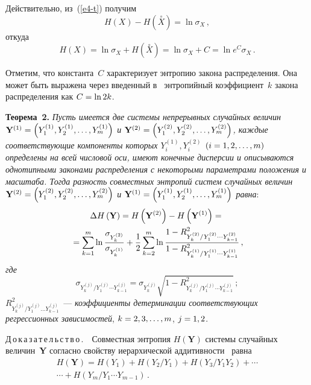 \begin{multicols}{2}
  \medskip
  
  Действительно, из~(\ref{e4-t}) получим 
  $$
  H(X)- H(\overset{\circ}{X})   =\ln \sigma_X\,,
  $$ откуда
  $$
  H(X) =\ln \sigma_X +H(\overset{\circ}{X})=\ln \sigma_X +C =\ln e^C 
\sigma_X\,.
  $$
  
  Отметим, что константа~$C$ характеризует энтропию закона распределения. 
Она может быть выражена через введенный в~\cite{10-t} энтропийный 
коэффициент~$k$ закона распределения как $C\hm= \ln 2k$.
  
  
  \medskip
  
  \noindent
  \textbf{Теорема~2.} \textit{Пусть имеется две системы непрерывных 
случайных величин $\mathbf{Y}^{(1)} \hm= \left(Y_1^{(1)}, Y_2^{(1)},\ldots , 
Y_m^{(1)}\right)$ и $\mathbf{Y}^{(2)} \hm= \left(Y_1^{(2)}, Y_2^{(2)},\ldots , Y_m^{(2)}\right)$, 
каждые со\-от\-вет\-ст\-ву\-ющие компоненты которых $Y_i^{(1)}, Y_i^{(2)}$ 
$(i\hm=1,2,\ldots , m)$ определены на всей числовой оси, имеют конечные 
дисперсии и описываются однотипными законами распределения с 
некоторыми параметрами положения и масштаба. \mbox{Тогда} разность 
совместных энтропий сис\-тем случайных величин $\mathbf{Y}^{(2)} \hm= 
\left(Y_1^{(2)}, Y_2^{(2)},\ldots , Y_m^{(2)}\right)$ и 
$\mathbf{Y}^{(1)} \hm= \left(Y_1^{(1)}, 
Y_2^{(1)},\ldots , Y_m^{(1)}\right)$ равна}:
  \begin{multline}
  \Delta H\left(\mathbf{Y}\right) =H\left(\mathbf{Y}^{(2)}\right) -H\left(\mathbf{Y}^{(1)} \right)={}\\
  {}=\sum\limits_{k=1}^m \ln \displaystyle\frac{\displaystyle \sigma_{Y_k^{(2)}}\mathstrut}{\displaystyle \sigma_{Y_k^{(1)}}\mathstrut}+
\displaystyle\frac{\displaystyle 1\mathstrut}{\displaystyle 2\mathstrut}  \sum\limits_{k=2}^m \ln \displaystyle\frac{\displaystyle 1-R^2_{Y_k^{(2)}/Y_1^{(2)}\cdots Y_{k-1}^{(2)}}\mathstrut}{\displaystyle 1-
R^2_{Y_k^{(1)}/Y_1^{(1)}\cdots Y_{k-1}^{(1)}}\mathstrut}\,,
  \label{e5-t}
  \end{multline}
  \textit{где}
  $$
  \sigma_{Y_k^{(j)}/Y_1^{(j)}\cdots Y_{k-1}^{(j)}} =\sigma_{Y_k^{(j)}}\sqrt{1-
R^2_{Y_k^{(j)}/Y_1^{(j)}\cdots Y_{k-1}^{(j)}}}\,;
  $$
  $R^2_{Y_k^{(j)}/Y_1^{(j)}\ldots Y_{k-1}^{(j)}}$~--- \textit{коэффициенты 
детерминации соответствующих регрессионных зависимостей}, $k\hm= 2, 3, 
\ldots , m$, $j\hm=1, 2$.
  
  \medskip
  
  \noindent
  Д\,о\,к\,а\,з\,а\,т\,е\,л\,ь\,с\,т\,в\,о\,.\ \ Совместная энтропия $H(\mathbf{Y})$ 
системы случайных величин~\textbf{Y} согласно свойству иерархической 
аддитивности~\cite{11-t} равна
  \begin{multline}
  H(\mathbf{Y}) =H(Y_1)+H\left( Y_2/Y_1\right) +H\left( 
Y_3/Y_1Y_2\right)+\cdots\\
\cdots  + H\left(Y_m/Y_1\cdots Y_{m-1}\right)\,.
  \label{e6-t}
  \end{multline}
  

\end{multicols}

